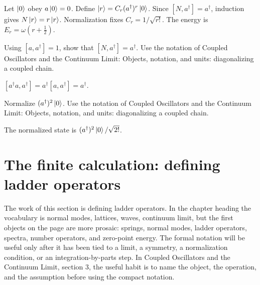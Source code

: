 \begin{example}
Let \(\left|0\right\rangle\) obey \(a\left|0\right\rangle=0\).  Define \(\left|r\right\rangle=C_r(a^\dagger)^r\left|0\right\rangle\).  Since \([N,a^\dagger]=a^\dagger\), induction gives \(N\left|r\right\rangle=r\left|r\right\rangle\).  Normalization fixes \(C_r=1/\sqrt{r!}\).  The energy is \(E_r=\omega(r+\frac12)\).
\end{example}



\begin{exercise}
Using \([a,a^\dagger]=1\), show that \([N,a^\dagger]=a^\dagger\).  Use the notation of Coupled Oscillators and the Continuum Limit: Objects, notation, and units: diagonalizing a coupled chain.
\begin{answer}
\([a^\dagger a,a^\dagger]=a^\dagger[a,a^\dagger]=a^\dagger\).
\end{answer}
\end{exercise}

\begin{exercise}
Normalize \((a^\dagger)^2\left|0\right\rangle\).  Use the notation of Coupled Oscillators and the Continuum Limit: Objects, notation, and units: diagonalizing a coupled chain.
\begin{answer}
The normalized state is \((a^\dagger)^2\left|0\right\rangle/\sqrt{2!}\).
\end{answer}
\end{exercise}



\section{The finite calculation: defining ladder operators}













The work of this section is defining ladder operators.  In the chapter heading the vocabulary is normal modes, lattices, waves, continuum limit, but the first objects on the page are more prosaic: springs, normal modes, ladder operators, spectra, number operators, and zero-point energy.  The formal notation will be useful only after it has been tied to a limit, a symmetry, a normalization condition, or an integration-by-parts step.  In Coupled Oscillators and the Continuum Limit, section 3, the useful habit is to name the object, the operation, and the assumption before using the compact notation.

